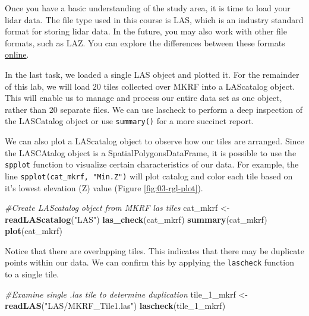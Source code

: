 \documentclass[
]{book}
\newenvironment{Shaded}{\begin{snugshade}}{\end{snugshade}}
\newcommand{\CommentTok}[1]{\textcolor[rgb]{0.56,0.35,0.01}{\textit{#1}}}
\newcommand{\FunctionTok}[1]{\textcolor[rgb]{0.13,0.29,0.53}{\textbf{#1}}}
\newcommand{\NormalTok}[1]{#1}
\newcommand{\OtherTok}[1]{\textcolor[rgb]{0.56,0.35,0.01}{#1}}
\newcommand{\StringTok}[1]{\textcolor[rgb]{0.31,0.60,0.02}{#1}}
\begin{document}
Once you have a basic understanding of the study area, it is time to load your lidar data. The file type used in this course is LAS, which is an industry standard format for storing lidar data. In the future, you may also work with other file formats, such as LAZ. You can explore the differences between these formats \href{https://rapidlasso.de/five-myths-about-las-laz-and-optimized-las/}{online}.

In the last task, we loaded a single LAS object and plotted it. For the remainder of this lab, we will load 20 tiles collected over MKRF into a LAScatalog object. This will enable us to manage and process our entire data set as one object, rather than 20 separate files. We can use lascheck to perform a deep inspection of the LASCatalog object or use \texttt{summary()} for a more succinct report.

We can also plot a LAScatalog object to observe how our tiles are arranged. Since the LASCAtalog object is a SpatialPolygonsDataFrame, it is possible to use the \texttt{spplot} function to visualize certain characteristics of our data. For example, the line \texttt{spplot(cat\_mkrf,\ "Min.Z")} will plot catalog and color each tile based on it's lowest elevation (Z) value (Figure \ref{fig:03-rgl-plot}).

\begin{Shaded}
\begin{Highlighting}[]
\CommentTok{\#Create LAScatalog object from MKRF las tiles}
\NormalTok{cat\_mkrf }\OtherTok{\textless{}{-}} \FunctionTok{readLAScatalog}\NormalTok{(}\StringTok{"LAS"}\NormalTok{)}
\FunctionTok{las\_check}\NormalTok{(cat\_mkrf)}
\FunctionTok{summary}\NormalTok{(cat\_mkrf)}
\FunctionTok{plot}\NormalTok{(cat\_mkrf)}
\end{Highlighting}
\end{Shaded}

Notice that there are overlapping tiles. This indicates that there may be duplicate points within our data. We can confirm this by applying the \texttt{lascheck} function to a single tile.

\begin{Shaded}
\begin{Highlighting}[]
\CommentTok{\#Examine single .las tile to determine duplication}
\NormalTok{tile\_1\_mkrf }\OtherTok{\textless{}{-}} \FunctionTok{readLAS}\NormalTok{(}\StringTok{"LAS/MKRF\_Tile1.las"}\NormalTok{)}
\FunctionTok{lascheck}\NormalTok{(tile\_1\_mkrf)}
\end{Highlighting}
\end{Shaded}
\end{document}
